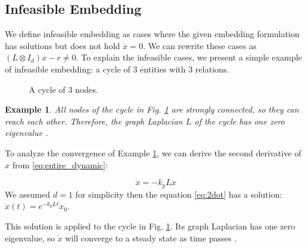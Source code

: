 \documentclass[letterpaper, 10 pt, conference]{ieeeconf}  %
\newtheorem{example}{Example}
\begin{document}
\subsection{Infeasible Embedding}
We define infeasible embedding as cases where the given embedding formulation has solutions but does not hold \(\dot{x} = 0\). We can rewrite these cases as \((L \otimes I_d)x - r \neq 0\). To explain the infeasible cases, we present a simple example of infeasible embedding: a cycle of 3 entities with 3 relations.

\begin{figure}[h]
\centering
{}
\caption{A cycle of 3 nodes.}
\label{fig:cycle}
\end{figure}

\begin{example}\label{ex:cycle}
    All nodes of the cycle in Fig. \ref{fig:cycle} are strongly connected, so they can reach each other. Therefore, the graph Laplacian \(L\) of the cycle has one zero eigenvalue \cite{olfati-saber_consensus_2007}.
\end{example}



To analyze the convergence of Example \ref{ex:cycle}, we can derive the second derivative of \(x\) from \eqref{eq:entire_dynamic}:

\begin{equation}\label{eq:2dot}
    \ddot{x} = -k_p L \dot{x}
\end{equation}
\noindent We assumed \(d = 1\) for simplicity then the equation \eqref{eq:2dot} has a solution: \( \dot{x}(t) = e^{-k_p Lt} \dot{x}_0 \). 

This solution is applied to the cycle in Fig. \ref{fig:cycle}. Its graph Laplacian has one zero eigenvalue, so \(\dot{x}\) will converge to a steady state as time passes \cite{mirzaev_laplacian_2013}.
\end{document}
